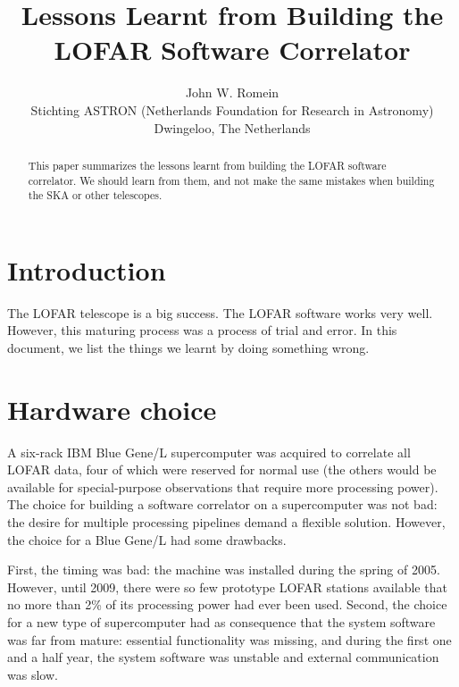 \documentclass[article]{sig-alternate}
\begin{document}
\title{Lessons Learnt from Building the LOFAR Software Correlator}

\author{John W. Romein \\[3mm]
Stichting ASTRON (Netherlands Foundation for Research in Astronomy) \\
Dwingeloo, The Netherlands
}

\date{}

\maketitle


\begin{abstract}
This paper summarizes the lessons learnt from building the LOFAR software
correlator.
We should learn from them, and not make the same mistakes when building the
SKA or other telescopes.
\end{abstract}



\section{Introduction}

The LOFAR telescope is a big success.
The LOFAR software works very well.
However, this maturing process was a process of trial and error.
In this document, we list the things we learnt by doing something wrong.


\section{Hardware choice}

A six-rack IBM Blue Gene/L supercomputer was acquired to correlate all LOFAR
data, four of which were reserved for normal use (the others would be available
for special-purpose observations that require more processing power).
The choice for building a software correlator on a supercomputer was not bad:
the desire for multiple processing pipelines demand a flexible solution.
However, the choice for a Blue Gene/L had some drawbacks.

First, the timing was bad: the machine was installed during the spring of 2005.
However, until 2009, there were so few prototype LOFAR stations available
that no more than 2\% of its processing power had ever been used.
Second, the choice for a new type of supercomputer had as consequence that
the system software was far from mature: essential functionality was missing,
and during the first one and a half year, the system software was unstable
and external communication was slow.
\end{document}

